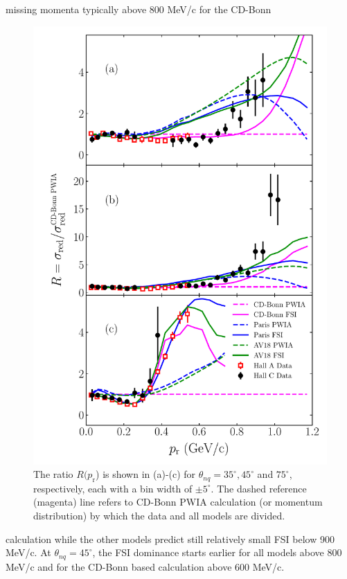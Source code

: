 missing momenta typically above 800 MeV/c for the CD-Bonn
\begin{figure}[!t]
\includegraphics[scale=0.5]{./prl_plots/PRL_plot2.pdf}
\caption{The ratio $R(p_{\mathrm{r}}$) is shown in (a)-(c) for $\theta_{nq}=35^{\circ}, 45^{\circ}$ and $75^{\circ}$, respectively, each with a bin width of $\pm 5^{\circ}$.
The dashed reference (magenta) line refers to CD-Bonn PWIA calculation (or momentum distribution) by which the data and all models are divided.}
\label{fig:fig2}
\end{figure}
calculation while the other models predict still relatively small FSI below 900 MeV/c.
At $\theta_{nq}=45^{\circ}$, the FSI dominance starts earlier for all models above 800 MeV/c and for the CD-Bonn based calculation above 600 MeV/c. \\
